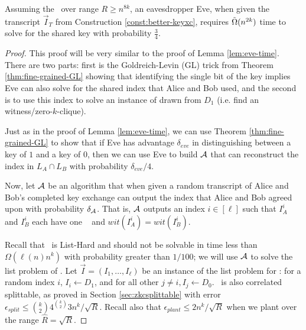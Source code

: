 \begin{lemma}\label{lem:zkc-eve-time}
	Assuming the \strongzkc~over range $R \geq n^{8k}$, an eavesdropper Eve, when given the transcript $\vec I_T$ from Construction \ref{const:better-keyxc}, requires $\~\Omega(n^{2k})$ time to solve for the shared key with probability $\frac{3}{4}$.
\end{lemma}
\begin{proof}
	This proof will be very similar to the proof of Lemma \ref{lem:eve-time}. There are two parts: first is the Goldreich-Levin (GL) trick from Theorem \ref{thm:fine-grained-GL} showing that identifying the single bit of the key implies Eve can also solve for the shared index that Alice and Bob used, and the second is to use this index to solve an instance of \zkclique drawn from $D_1$ (i.e. find an witness/zero-$k$-clique).
	
	Just as in the proof of Lemma \ref{lem:eve-time}, we can use Theorem \ref{thm:fine-grained-GL} to show that if Eve has advantage $\delta_{eve}$ in distinguishing between a key of $1$ and a key of $0$, then we can use Eve to build $\cA$ that can reconstruct the index in $L_A \cap L_B$ with probability $\delta_{eve}/4$.
	
	Now, let $\cA$ be an algorithm that when given a random transcript of Alice and Bob's completed key exchange can output the index that Alice and Bob agreed upon with probability $\delta_{\cA}$. That is, $\cA$ outputs an index $i \in [\ell]$ such that $I_A^i$ and $I_B^i$ each have one \zkclique~ and $wit(I_A^i) = wit(I_B^i)$.
	
	Recall that \zkclique~is List-Hard and should not be solvable in time less than $\Omega(\ell(n)n^{k})$ with probability greater than $1/100$; we will use $\cA$ to solve the list problem of \zkclique. Let $\vec I = ( I_1, \ldots, I_\ell )$ be an instance of the list problem for \zkclique: for a random index $i$, $I_i \gets D_1$, and for all other $j \neq i, I_j \gets D_0$.
	\zkclique~is also correlated splittable, as proved in Section \ref{sec:zkcsplittable} with error $\epsilon_{split} \leq \binom{k}{2}4^{\binom{k}{2}}3 n^k/\sqrt{R}$. Recall also that $\epsilon_{plant} \leq 2n^k/\sqrt R$ when we plant over the range $\hat R = \sqrt{R}$.
	

\end{proof}
